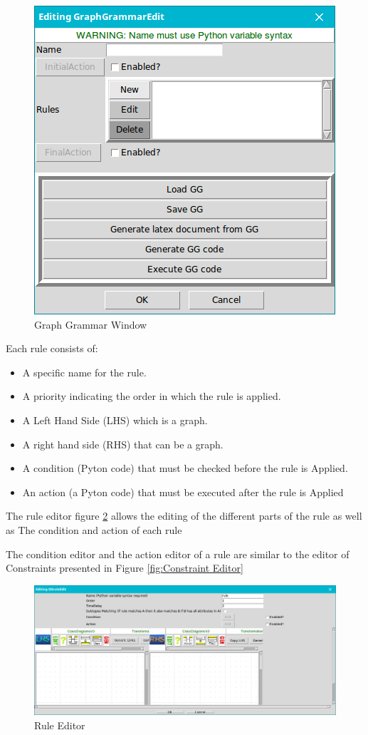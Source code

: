 \begin{figure}[th]
	\centering 
	\includegraphics[scale=0.5]{Chapiter3/img/GraphGrammar}
	\caption{\label{fig:Graph Grammar Window}Graph Grammar Window}
\end{figure} 
 

 Each rule consists of: 
\begin{itemize}
\item  A specific name for the rule.
\item  A priority indicating the order in which the rule is applied.
\item  A Left Hand Side (LHS) which is a graph.
\item  A right hand side (RHS) that can be a graph.
\item  A condition (Pyton code) that must be checked before the rule is
Applied.
\item An action (a Pyton code) that must be executed after the rule is
Applied
\end{itemize}


The rule editor figure \ref{fig:Rule Editor} allows the editing of the different parts of the rule as well as
The condition and action of each rule 
 
 The condition editor and the action editor of a rule are similar to the editor of
Constraints presented in Figure \ref{fig:Constraint Editor}


\begin{figure}[th]
	\centering
 	\includegraphics[scale=0.38]{Chapiter3/img/ruleEditor}
	\caption{\label{fig:Rule Editor}Rule Editor}
\end{figure} 
 


